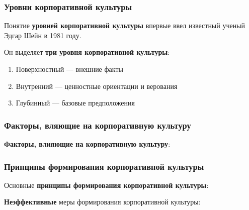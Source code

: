 \documentclass[a4paper,14pt]{extarticle}
\begin{document}
\begin{multienumerate}
\end{multienumerate}

\subsubsection{Уровни корпоративной культуры}

Понятие \textbf{уровней корпоративной культуры} впервые ввел известный ученый Эдгар Шейн в 1981 году.

Он выделяет \textbf{три уровня корпоративной культуры}:

\begin{enumerate}
    \item Поверхностный — внешние факты
    \item Внутренний — ценностные ориентации и верования
    \item Глубинный — базовые предположения
\end{enumerate}

\subsubsection{Факторы, вляющие на корпоративную культуру}

\textbf{Факторы, влияющие на корпоративную культуру}:

\begin{multienumerate}
\end{multienumerate}

\subsubsection{Принципы формирования корпоративной культуры}

Основные \textbf{принципы формирования корпоративной культуры}:

\begin{multienumerate}
\end{multienumerate}

\textbf{Неэффективные} меры формирования корпоративной культуры:
\end{document}
